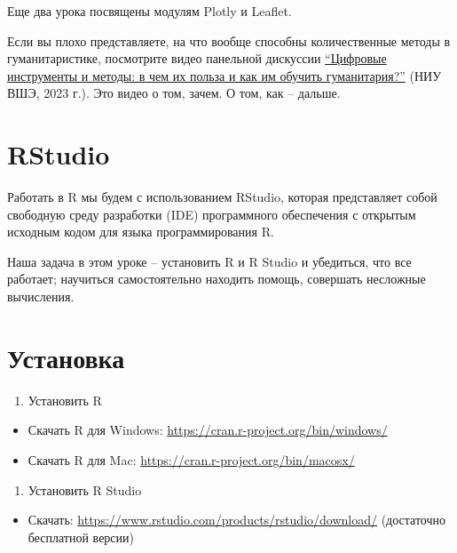 \documentclass[
]{book}
\providecommand{\tightlist}{%
  \setlength{\itemsep}{0pt}\setlength{\parskip}{0pt}}
\theoremstyle{definition}
\theoremstyle{definition}
\theoremstyle{definition}
\theoremstyle{definition}
\theoremstyle{remark}
\begin{document}
Еще два урока посвящены модулям Plotly и Leaflet.

Если вы плохо представляете, на что вообще способны количественные методы в гуманитаристике, посмотрите видео панельной дискуссии \href{https://vk.com/video-211800158_456239307}{``Цифровые инструменты и методы: в чем их польза и как им обучить гуманитария?''} (НИУ ВШЭ, 2023 г.). Это видео о том, зачем. О том, как -- дальше.

\hypertarget{rstudio}{%
\section{RStudio}\label{rstudio}}

Работать в R мы будем с использованием RStudio, которая представляет собой свободную среду разработки (IDE) программного обеспечения с открытым исходным кодом для языка программирования R.

Наша задача в этом уроке -- установить R и R Studio и убедиться, что все работает; научиться самостоятельно находить помощь, совершать несложные вычисления.

\hypertarget{ux443ux441ux442ux430ux43dux43eux432ux43aux430}{%
\section{Установка}\label{ux443ux441ux442ux430ux43dux43eux432ux43aux430}}

\begin{enumerate}
\def\labelenumi{\arabic{enumi}.}
\tightlist
\item
  Установить R
\end{enumerate}

\begin{itemize}
\tightlist
\item
  Скачать R для Windows: \url{https://cran.r-project.org/bin/windows/}
\item
  Скачать R для Mac: \url{https://cran.r-project.org/bin/macosx/}
\end{itemize}

\begin{enumerate}
\def\labelenumi{\arabic{enumi}.}
\setcounter{enumi}{1}
\tightlist
\item
  Установить R Studio
\end{enumerate}

\begin{itemize}
\tightlist
\item
  Скачать: \url{https://www.rstudio.com/products/rstudio/download/} (достаточно бесплатной версии)
\end{itemize}
\end{document}
